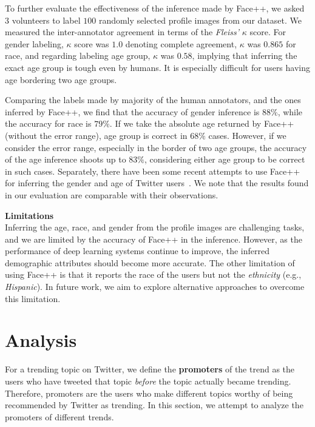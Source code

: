 \documentclass[letterpaper]{article}
\begin{document}
To further evaluate the effectiveness of the inference made by Face++,
we asked $3$ volunteers to label $100$ randomly selected profile images from our dataset.
We measured the inter-annotator agreement in terms of the {\it Fleiss'} $\kappa$ score.
For gender labeling, $\kappa$ score was $1.0$ denoting complete agreement, $\kappa$ was $0.865$ for race,
and regarding labeling age group, $\kappa$ was $0.58$, implying that inferring the exact age group is tough
even by  humans. It is especially difficult for users having age bordering two age groups.

Comparing the labels made by majority of the human annotators, and the ones inferred by Face++,
we find that the accuracy of gender inference is $88\%$, while the accuracy for race is $79\%$.
If we take the absolute age returned by Face++ (without the error range), age group is correct
in $68\%$ cases. However, if we consider the error range, especially in the border of two age groups,
the accuracy of the age inference shoots up to $83\%$, considering either age group to be correct in such cases.
Separately, there have been some recent attempts to use Face++ for inferring the gender and
age of Twitter users~\cite{Zagheni2014,an2016greysanatomy}.
We note that the results found in our evaluation are comparable with their observations.

\vspace{1mm}
\noindent \textbf{Limitations } \\
\noindent Inferring the age, race, and gender from the profile images
are challenging tasks, and we are limited by the accuracy of Face++ in the inference.
However, as the performance of deep learning systems continue to
improve, the inferred demographic attributes should become more accurate.
The other limitation of using Face++ is that it reports the race of the users but
not the {\it ethnicity} (e.g., {\it Hispanic}). In future work, we aim to explore
alternative approaches to overcome this limitation. 

\section{Analysis}
\label{sec:analysis_promoters}
\noindent
For a trending topic on Twitter, we define the {\bf promoters} of the trend as the users who have tweeted that topic
{\it before} the topic actually became trending.
Therefore, promoters are the users who make different topics worthy of being recommended by Twitter as trending.
In this section, we attempt to analyze the promoters of different trends.
\end{document}
